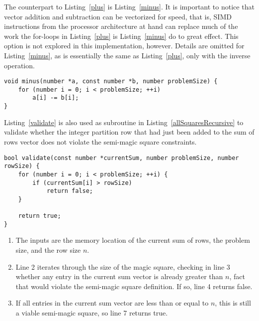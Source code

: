The counterpart to Listing~\ref{plus} is Listing~\ref{minus}. It is important to notice that vector addition and subtraction can be vectorized for speed, that is, SIMD instructions from the processor architecture at hand can replace much of the work the for-loops in Listing~\ref{plus} is Listing~\ref{minus} do to great effect. This option is not explored in this implementation, however. Details are omitted for Listing~\ref{minus}, as is essentially the same as Listing~\ref{plus}, only with the inverse operation.

\begin{lstlisting}[caption={Subtracting one vector from another.},label={minus}]
void minus(number *a, const number *b, number problemSize) {
    for (number i = 0; i < problemSize; ++i)
        a[i] -= b[i];
}
\end{lstlisting}

Listing~\ref{validate} is also used as subroutine in Listing~\ref{allSquaresRecursive} to validate whether the integer partition row that had just been added to the sum of rows vector does not violate the semi-magic square constraints.

\begin{lstlisting}[caption={Validating a sum of integer partition rows.},label={validate}]
bool validate(const number *currentSum, number problemSize, number rowSize) {
    for (number i = 0; i < problemSize; ++i) {
        if (currentSum[i] > rowSize)
            return false;
    }

    return true;
}
\end{lstlisting}

\begin{enumerate}
\item The inputs are the memory location of the current sum of rows, the problem size, and the row size $n$.
\item Line 2 iterates through the size of the magic square, checking in line 3 whether any entry in the current sum vector is already greater than $n$, fact that would violate the semi-magic square definition. If so, line 4 returns false.
\addtocounter{enumi}{4}
\item If all entries in the current sum vector are less than or equal to $n$, this is still a viable semi-magic square, so line 7 returns true.
\end{enumerate}

